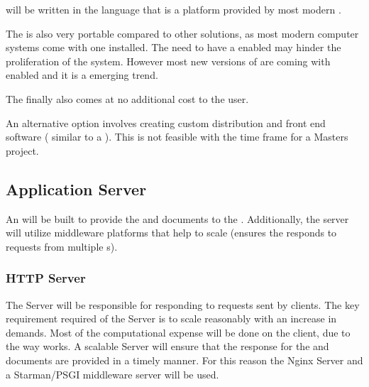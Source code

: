 \documentclass[11pt]{report}
\begin{document}
 will be written in the  language that is a platform provided by most modern . 

The  is also very portable compared to other solutions, as most modern computer systems come with one installed. The need to have a  enabled  may hinder the proliferation of the system. However most new versions of  are coming with  enabled and it is a emerging trend.

The  finally also comes at no additional cost to the user.  

An alternative option involves creating custom distribution and front end software ( similar to a  ). This is not feasible with the time frame for a Masters project.  

\subsection{Application Server}


An  will be built to provide the  and  documents to the . Additionally, the server will utilize middleware platforms that help to scale (ensures the  responds to requests from multiple s).

\subsubsection{HTTP Server}


The  Server will be responsible for responding to requests sent by  clients. The key requirement required of the  Server is to scale reasonably with an increase in demands. Most of the computational expense will be done on the  client, due to the way  works. A scalable  Server will ensure that the response for the  and  documents are provided in a timely manner. For this reason the Nginx  Server and a Starman/PSGI middleware server will be used.
\end{document}
